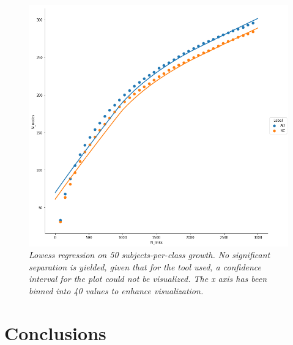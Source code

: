 \documentclass[12pt,openright,twoside,a4paper]{book}
\begin{document}
\begin{figure}[!h]
\centering
\includegraphics[scale=0.4]{ADNI-lowess}
\caption{\textit{Lowess regression on 50 subjects-per-class growth. No significant separation is yielded, given that for the tool used, a confidence interval for the plot could not be visualized. The x axis has been binned into 40 values to enhance visualization.}}
\label{ADNI-lowess}
\end{figure}

\chapter*{Conclusions}

\backmatter
\end{document}
